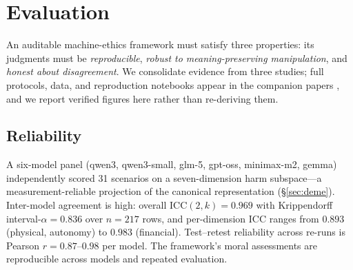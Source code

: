 
\section{Evaluation}
\label{sec:eval}

An auditable machine-ethics framework must satisfy three properties: its judgments must be
\emph{reproducible}, \emph{robust to meaning-preserving manipulation}, and \emph{honest
about disagreement}. We consolidate evidence from three studies; full protocols, data, and
reproduction notebooks appear in the companion papers \citep{bond2026secureai,bond2026deme},
and we report verified figures here rather than re-deriving them.

\subsection{Reliability}
A six-model panel (qwen3, qwen3-small, glm-5, gpt-oss, minimax-m2, gemma) independently
scored 31 scenarios on a seven-dimension harm subspace---a measurement-reliable projection
of the canonical representation (\S\ref{sec:deme}). Inter-model agreement is high: overall
ICC$(2,k)=0.969$ with Krippendorff interval-$\alpha=0.836$ over $n=217$ rows, and
per-dimension ICC ranges from $0.893$ (physical, autonomy) to $0.983$ (financial).
Test--retest reliability across re-runs is Pearson $r=0.87$--$0.98$ per model. The framework's
moral assessments are reproducible across  models and repeated evaluation.

